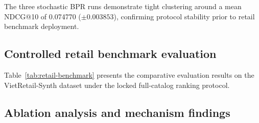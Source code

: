 \documentclass[10pt,a4paper]{article}
\begin{document}
The three stochastic BPR runs demonstrate tight clustering around a mean NDCG@10 of 0.074770 ($\pm 0.003853$), confirming protocol stability prior to retail benchmark deployment.

\subsection{Controlled retail benchmark evaluation}

Table~\ref{tab:retail-benchmark} presents the comparative evaluation results on the VietRetail-Synth dataset under the locked full-catalog ranking protocol.

\begin{table}[htbp]
\centering
\renewcommand{\arraystretch}{1.25}
\caption{Comparative evaluation on the \texttt{VietRetail-Synth} benchmark under the full-catalog protocol ($C_u = I \setminus H_u^{\mathrm{seen}}$).}
\label{tab:retail-benchmark}
\end{table}

\subsection{Ablation analysis and mechanism findings}
\end{document}
